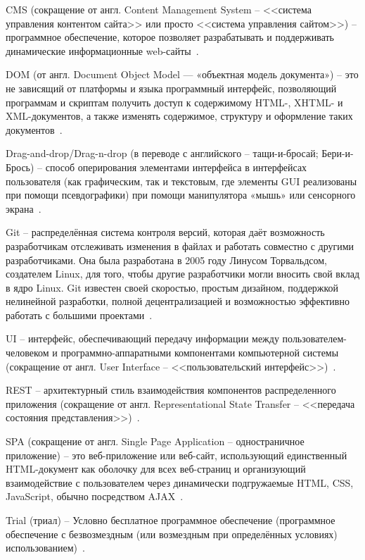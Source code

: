 CMS (сокращение от англ. Content Management System -- <<система управления контентом сайта>> или просто <<система управления сайтом>>) -- программное обеспечение, которое позволяет разрабатывать и поддерживать динамические информационные web-сайты~\cite{cms}.

DOM (от англ. Document Object Model — «объектная модель документа») -- это не зависящий от платформы и языка программный интерфейс, позволяющий программам и скриптам получить доступ к содержимому HTML-, XHTML- и XML-документов, а также изменять содержимое, структуру и оформление таких документов~\cite{wiki_dom}.

Drag-and-drop/Drag-n-drop (в переводе с английского -- тащи-и-бросай; Бери-и-Брось) -- способ оперирования элементами интерфейса в интерфейсах пользователя (как графическим, так и текстовым, где элементы GUI реализованы при помощи псевдографики) при помощи манипулятора «мышь» или сенсорного экрана~\cite{wiki_dnd}.

Git -- распределённая система контроля версий, которая даёт возможность разработчикам отслеживать изменения в файлах и работать совместно с другими разработчиками. Она была разработана в 2005 году Линусом Торвальдсом, создателем Linux, для того, чтобы другие разработчики могли вносить свой вклад в ядро Linux. Git известен своей скоростью, простым дизайном, поддержкой нелинейной разработки, полной децентрализацией и возможностью эффективно работать с большими проектами~\cite{git}.

UI --  интерфейс, обеспечивающий передачу информации между пользователем-человеком и программно-аппаратными компонентами компьютерной системы (сокращение от англ.  User Interface -- <<пользовательский интерфейс>>)~\cite{wiki_ui}.

REST -- архитектурный стиль взаимодействия компонентов распределенного приложения (сокращение от англ. Representational State Transfer -- <<передача состояния представления>>)~\cite{wiki_rest}.

SPA (сокращение от англ. Single Page Application -- одностраничное приложение) -- это веб-приложение или веб-сайт, использующий единственный HTML-документ как оболочку для всех веб-страниц и организующий взаимодействие с пользователем через динамически подгружаемые HTML, CSS, JavaScript, обычно посредством AJAX~\cite{wiki_spa}.

Trial (триал) -- Условно бесплатное программное обеспечение (программное обеспечение с безвозмездным (или возмездным при определённых условиях) использованием)~\cite{wiki_trial}.

